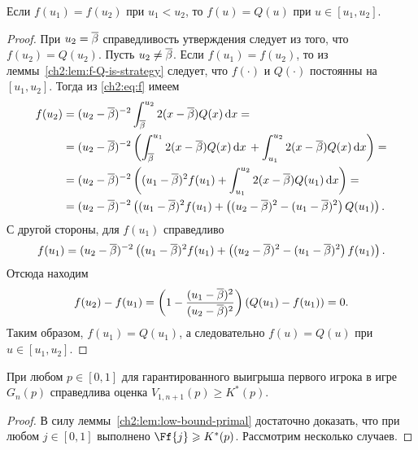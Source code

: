 {\begin{lemma}
  \label{ch2:lem:f=Q}
  Если $f(u_1) = f(u_2)$ при $u_1 < u_2$, то $f(u) = Q(u)$ при $u \in [u_1, u_2]$.
\end{lemma}
\begin{proof}
  При $u_2 = {\overline{\beta}}$ справедливость утверждения следует из того, что $f(u_2) = Q(u_2)$.
  Пусть $u_2 \neq {\overline{\beta}}$. 
  Если $f(u_1) = f(u_2)$, то из леммы~\ref{ch2:lem:f-Q-is-strategy} следует, что $f(\cdot)$ и $Q(\cdot)$ постоянны на $[u_1, u_2]$.
  Тогда из \eqref{ch2:eq:f} имеем
  \begin{align*}
    f(u_2)
    &= (u_2 - {\overline{\beta}})^{-2} \int_{{\overline{\beta}}}^{u_2} 2 (x - {\overline{\beta}}) Q(x) \mathop{}\!\mathrm{d} x = \\
    &= (u_2 - {\overline{\beta}})^{-2} \left(
      \int_{{\overline{\beta}}}^{u_1} 2 (x - {\overline{\beta}}) Q(x) \mathop{}\!\mathrm{d} x \, +
      \int_{u_1}^{u_2} 2 (x - {\overline{\beta}}) Q(x) \mathop{}\!\mathrm{d} x
      \right) = \\
    &= (u_2 - {\overline{\beta}})^{-2} \left(
      (u_1 - {\overline{\beta}})^2 f(u_1) +
      \int_{u_1}^{u_2} 2 (x - {\overline{\beta}}) Q(u_1) \mathop{}\!\mathrm{d} x
      \right) = \\
    &= (u_2 - {\overline{\beta}})^{-2} \left(
      (u_1 - {\overline{\beta}})^2 f(u_1) +
      \left( (u_2 - {\overline{\beta}})^2 - (u_1 - {\overline{\beta}})^2 \right) Q(u_1)
      \right).
  \end{align*}
  С другой стороны, для $f(u_1)$ справедливо
  \begin{equation*}
    f(u_1) = (u_2 - {\overline{\beta}})^{-2} \left(
      (u_1 - {\overline{\beta}})^2 f(u_1) +
      \left( (u_2 - {\overline{\beta}})^2 - (u_1 - {\overline{\beta}})^2 \right) f(u_1)
    \right).
  \end{equation*}
  Отсюда находим
  \begin{equation*}
    f(u_2) - f(u_1) = \left(1 - \frac{(u_1 - {\overline{\beta}})^2}{(u_2 - {\overline{\beta}})^2}\right)(Q(u_1) - f(u_1)) = 0.
  \end{equation*}
  Таким образом, $f(u_1) = Q(u_1)$, а следовательно $f(u) = Q(u)$ при $u \in [u_1, u_2]$.
\end{proof}

\begin{theorem}\label{ch2:thm:V-bound}
  При любом $p \in [0, 1]$ для гарантированного выигрыша первого игрока в игре $G_n(p)$ справедлива оценка $V_{1,n+1}(p) \geqslant K^*(p)$.
\end{theorem}
\begin{proof}
  В силу леммы~\ref{ch2:lem:low-bound-primal} достаточно доказать, что при любом $j \in [0, 1]$ выполнено $\Ff{j} \geqslant K^*(p)$.
  Рассмотрим несколько случаев.


\end{proof}}
